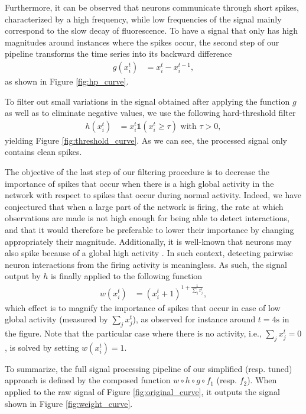 \documentclass[wcp]{jmlr}
\begin{document}
Furthermore, it can be observed that neurons communicate through short spikes, characterized by a high
frequency, while low frequencies of the signal mainly correspond to the slow
decay of fluorescence. To have a signal that only has high magnitudes around instances where the spikes occur, the second step of our pipeline transforms the time series into its backward
difference
\begin{align}
g(x^{t}_{i}) &= x^{t}_i - x^{t-1}_i \label{eq:high-pass-filter},
\end{align}
as shown in Figure \ref{fig:hp_curve}.

To filter out small variations in the signal obtained after applying the
function $g$ as well as to eliminate negative values, we use the following
hard-threshold filter
\begin{align}
h(x^{t}_i) &= x^{t}_i \mathbb{1}(x^{t}_i \geq \tau) \text{ with } \tau > 0,
\end{align}
yielding Figure \ref{fig:threshold_curve}.
As we can see, the processed signal only contains clean spikes.

The objective of the last step of our filtering procedure is to decrease the
importance of spikes that occur when there is a high global activity in the
network with respect to  spikes that occur during normal activity. Indeed, we
have conjectured that when a large part of the network is firing, the rate at
which observations are made is not high enough for being able to detect
interactions, and that it would therefore be preferable to lower their
importance by changing appropriately their magnitude. Additionally, it is
well-known that neurons may also spike because of a global high activity
\citep{stetter2012model}. In such  context, detecting pairwise neuron
interactions from the firing activity is meaningless. As such,
the signal output by $h$ is finally applied to the following function
\begin{align}
 w(x^{t}_i) &= (x^{t}_i + 1 )^{1 + \frac{1}{\sum_{j} x^{t}_j}},
\end{align}
which effect is to magnify the importance of spikes that occur in case of low
global activity (measured by $\sum_{j} x^{t}_j$), as observed for instance
around $t=4\text{s}$ in the figure. Note that the particular case where there
is no activity, i.e., $\sum_{j} x^{t}_j = 0$, is solved by setting $w(x^{t}_i)
= 1$.

To summarize, the full signal processing pipeline of our simplified (resp.
tuned) approach is defined by the composed function $w \circ h \circ g \circ
f_1$ (resp. $f_2$). When applied to the raw signal of Figure
\ref{fig:original_curve}, it outputs the signal shown in Figure
\ref{fig:weight_curve}.
\end{document}
